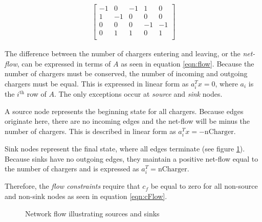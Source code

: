 \begin{align}
	\begin{bmatrix}
		-1 & 0 & -1 & 1 & 0 \\
		1 & -1 & 0 & 0 & 0 \\
		0 & 0 & 0 & -1 & -1 \\
		0 & 1 & 1 & 0 & 1 \\
	\end{bmatrix}
\end{align}
\par  The difference between the number of chargers entering and leaving, or the \textit{net-flow}, can be expressed in terms of $A$ as seen in equation \ref{eqn:flow}.  Because the number of chargers must be conserved, the number of incoming and outgoing chargers must be equal. This is expressed in linear form as $a_i^{T}x = 0$, where $a_i$ is the $i^{\text{th}}$ row of $A$. The only exceptions occur at \textit{source} and \textit{sink} nodes.
\par A source node represents the beginning state for all chargers.  Because edges originate here, there are no incoming edges and the net-flow will be minus the number of chargers. This is described in linear form as $a_i^Tx = -\text{nCharger}$.
\par Sink nodes represent the final state, where all edges terminate (see figure \ref{fig:sourceSink}). Because sinks have no outgoing edges, they maintain a positive net-flow equal to the number of chargers and is expressed as $a_i^T = \text{nCharger}$. 
\par Therefore, the \textit{flow constraints} require that $c_f$ be equal to zero for all non-source and non-sink nodes as seen in equation \ref{eqn:cFlow}.  
\begin{figure}
	\centering
{}
	\caption{Network flow illustrating sources and sinks}
	\label{fig:sourceSink} 
\end{figure} 
